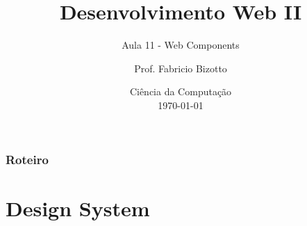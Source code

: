 \documentclass[
	9pt, %
	t, %
]{beamer}
\title[DesWebII]{Desenvolvimento Web II} %
\subtitle{Aula 11 - Web Components} %
\author[Fabricio Bizotto]{Prof. Fabricio Bizotto} %
\institute[IFC]{Instituto Federal Catarinense \\ \smallskip \textit{fabricio.bizotto@ifc.edu.br}} %
\date[\today]{Ciência da Computação \\ \today} %
\begin{document}

\begin{frame}
	\titlepage %
\end{frame}


\begin{frame}
	\frametitle{Roteiro} %

	\tableofcontents %
\end{frame}


\section{Design System}
\end{document}
